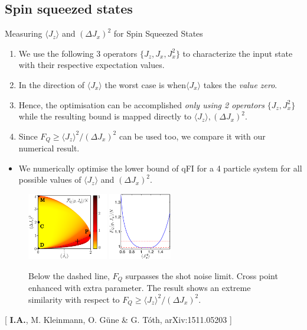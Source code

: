 \documentclass{beamer}
\newcommand{\expect}[1]{\ensuremath{\langle #1 \rangle}}
\newcommand{\varian}[1]{\ensuremath{\left(\Delta #1 \right)^2}}
\newcommand{\citate}[1]{{\footnotesize{\color{gray}[ #1 ]}}

	}
\begin{document}
	\subsection{Spin squeezed states}

		\begin{frame}
			{Measuring $\expect{J_z}$ and $\varian{J_x}$ for Spin Squeezed States}

			\begin{enumerate}
				\item<1-> We use the following 3 operators {\color{blue}$\{ J_z,J_x,J_x^2 \}$} to characterize the input state with their respective expectation values.
				\item<2-> In the direction of $\expect{J_x}$ the worst case is when$\expect{J_x}$ takes the \emph{\color{blue}value zero}.
				\item<3-> Hence, the optimisation can be accomplished \emph{\color{blue} only using 2 operators} $\{ J_z,J_x^2 \}$ while the resulting bound is mapped directly to $\expect{J_z},\varian{J_x}$.
				\item<4-> Since $F_Q\geq \expect{J_z}^2/\varian{J_x}$ can be used too, we compare it with our numerical result.

			\end{enumerate}

		\end{frame}

		\begin{frame}
			\begin{itemize}
				\item We numerically optimise the lower bound of qFI for a 4 particle system for all possible values of $\expect{J_z}$ and $\varian{J_x}$.
			\end{itemize}
			\begin{figure}
				\includegraphics[height=110px]{img/lb-spsq.pdf}
				\hspace{15px}
				\includegraphics[height=110px]{img/4thparameter-spsq.pdf}
				\caption{Below the dashed line, $F_Q$ surpasses the shot noise limit. Cross point enhanced with extra parameter. The result shows an extreme similarity with respect to $F_Q\geq \expect{J_z}^2/\varian{J_x}$.}
			\end{figure}
			\vspace{-15px}
			\citate{{\bf I.A.}, M. Kleinmann, O. G\"une \& G. T\'oth, arXiv:1511.05203}

		\end{frame}
\end{document}
